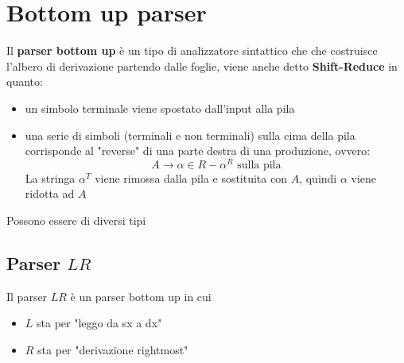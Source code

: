 \chapter{Bottom up parser}

Il \textbf{parser bottom up} è un tipo di analizzatore sintattico che che costruisce l'albero di derivazione partendo dalle foglie, viene anche detto \textbf{Shift-Reduce} in quanto:
\begin{itemize}
    \item un simbolo terminale viene spostato dall'input alla pila
    \item una serie di simboli (terminali e non terminali) sulla cima della pila corrisponde al "reverse" di una parte destra di una produzione, ovvero:
    \[
        A\to\alpha \in R - \alpha^R \text{ sulla pila}
    \]
    La stringa $\alpha^T$ viene rimossa dalla pila e sostituita con $A$, quindi $\alpha$ viene ridotta ad $A$
\end{itemize}
 
Possono essere di diversi tipi

\section{Parser $LR$}
Il parser $LR$ è un parser bottom up in cui
\begin{itemize}
    \item $L$ sta per "leggo da sx a dx"
    \item $R$ sta per "derivazione rightmost"
\end{itemize}



